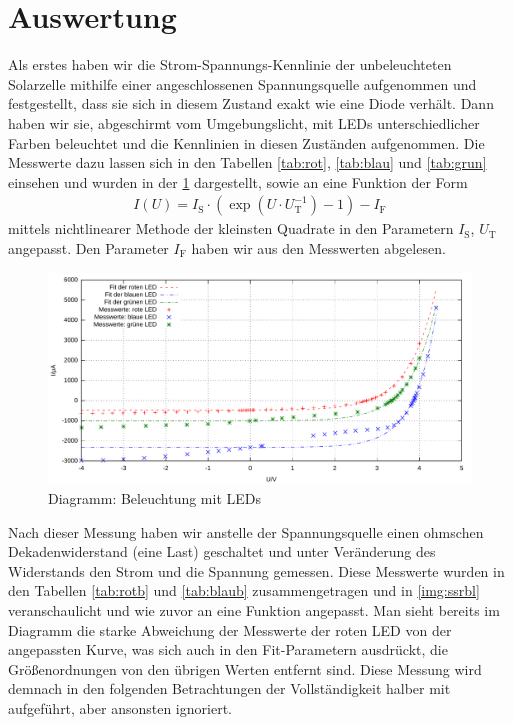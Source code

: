 \documentclass[numbers=noenddot,12pt,a4paper]{scrartcl}
\newcommand{\ix}[1]{_\text{#1}}
\begin{document}
\section{Auswertung}
Als erstes haben wir die Strom-Spannungs-Kennlinie der unbeleuchteten Solarzelle mithilfe einer angeschlossenen Spannungsquelle aufgenommen und festgestellt, dass sie sich in diesem Zustand exakt wie eine Diode verhält. Dann haben wir sie, abgeschirmt vom Umgebungslicht, mit LEDs unterschiedlicher Farben beleuchtet und die Kennlinien in diesen Zuständen aufgenommen. Die Messwerte dazu lassen sich in den Tabellen \ref{tab:rot}, \ref{tab:blau} und \ref{tab:grun} einsehen und wurden in der \ref{img:ssrl} dargestellt, sowie an eine Funktion der Form
\begin{align}
I(U)=I\ix{S}\cdot\left(\exp\left(U\cdot U\ix{T}^{-1}\right)-1\right)-I\ix{F}
\end{align}
mittels nichtlinearer Methode der kleinsten Quadrate in den Parametern $I\ix{S}$, $U\ix{T}$ angepasst. Den Parameter $I\ix{F}$ haben wir aus den Messwerten abgelesen.
\begin{figure}[H]
	\includegraphics[width=1\textwidth]{messwerte/stromspannungspannungsrichtigled.pdf}
	\caption{Diagramm: Beleuchtung mit LEDs} \label{img:ssrl}
\end{figure}
Nach dieser Messung haben wir anstelle der Spannungsquelle einen ohmschen Dekadenwiderstand (eine Last) geschaltet und unter Veränderung des Widerstands den Strom und die Spannung gemessen. Diese Messwerte wurden in den Tabellen \ref{tab:rotb} und \ref{tab:blaub} zusammengetragen und in \ref{img:ssrbl} veranschaulicht und wie zuvor an eine Funktion angepasst. Man sieht bereits im Diagramm die starke Abweichung der Messwerte der roten LED von der angepassten Kurve, was sich auch in den Fit-Parametern ausdrückt, die Größenordnungen von den übrigen Werten entfernt sind. Diese Messung wird demnach in den folgenden Betrachtungen der Vollständigkeit halber mit aufgeführt, aber ansonsten ignoriert.
\end{document}
